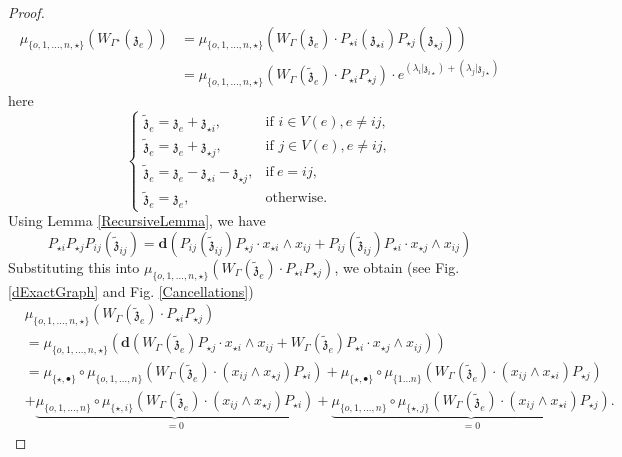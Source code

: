 \documentclass[11pt]{amsart}
\theoremstyle{definition}
\theoremstyle{remark}
\numberwithin{equation}{section}
\begin{document}
\begin{proof}
\begin{align*}
\mu_{\{o,1,\dots ,n,\star\}}\left(W_{\Gamma^{\star}}(\mathfrak{z}_{e})\right)   &=\mu_{\{o,1,\dots, n,\star\}}\left(W_{\Gamma}(\mathfrak{z}_{e})\cdot P_{\star i}(\mathfrak{z}_{\star i})P_{\star j}(\mathfrak{z}_{\star j})\right)     \\
   & =\mu_{\{o,1,\dots, n,\star\}}\left(W_{\Gamma}(\tilde{\mathfrak{z}}_{e})\cdot P_{\star i}P_{\star j}\right)\cdot e^{(\lambda_i|\mathfrak{z}_{i\star})+(\lambda_j|\mathfrak{z}_{j\star})}
\end{align*}
here
$$
\begin{cases}
\tilde{\mathfrak{z}}_e=\mathfrak{z}_e+\mathfrak{z}_{\star i}  , & \mbox{if } i\in V(e),e\neq ij, \\
\tilde{\mathfrak{z}}_e=\mathfrak{z}_e+\mathfrak{z}_{\star j}  , & \mbox{if } j\in V(e),e\neq ij,\\
\tilde{\mathfrak{z}}_e=\mathfrak{z}_e-\mathfrak{z}_{\star i}-\mathfrak{z}_{\star j}   , &  \mbox{if} \ e=ij,\\
\tilde{\mathfrak{z}}_e=\mathfrak{z}_e  , & \mbox{otherwise}.
\end{cases}
$$
Using Lemma \ref{RecursiveLemma}, we have
$$
  P_{\star i}P_{\star j}P_{ij}(\tilde{\mathfrak{z}}_{ij})=\mathbf{d}\left(P_{ij}(\tilde{\mathfrak{z}}_{ij})P_{\star j}\cdot x_{\star i}\wedge x_{ij}+P_{ij}(\tilde{\mathfrak{z}}_{ij})P_{\star i}\cdot x_{\star j}\wedge x_{ij}\right)
$$
Substituting this into $\mu_{\{o,1,\dots, n,\star\}}\left(W_{\Gamma}(\tilde{\mathfrak{z}}_{e})\cdot P_{\star i}P_{\star j}\right)$, we obtain (see Fig. \ref{dExactGraph} and Fig. \ref{Cancellations})
\begin{align*}
& \mu_{\{o,1,\dots, n,\star\}}\left(W_{\Gamma}(\tilde{\mathfrak{z}}_{e})\cdot P_{\star i}P_{\star j}\right)\\
  &= \mu_{\{o,1,\dots, n,\star\}}\left(\mathbf{d}\left(W_{\Gamma}(\tilde{\mathfrak{z}}_{e})P_{\star j}\cdot x_{\star i}\wedge x_{ij}+W_{\Gamma}(\tilde{\mathfrak{z}}_{e})P_{\star i}\cdot x_{\star j}\wedge x_{ij}\right)\right)  \\
   &= \mu_{\{\star,\bullet\}}\circ \mu_{\{o,1,\dots, n\}}\left(W_{\Gamma}(\tilde{\mathfrak{z}}_{e})\cdot (x_{ij}\wedge x_{\star j})P_{\star i }\right)+\mu_{\{\star,\bullet\}}\circ \mu_{\{1\dots n\}}\left(W_{\Gamma}(\tilde{\mathfrak{z}}_{e})\cdot (x_{ij}\wedge x_{\star i})P_{\star j}\right)\\
   &+ \underbrace{ \mu_{\{o,1,\dots ,n\}}\circ\mu_{\{\star, i\}}\left(W_{\Gamma}(\tilde{\mathfrak{z}}_{e})\cdot (x_{ij}\wedge x_{\star j})P_{\star i }\right)}_{=0}+\underbrace{\mu_{\{o,1,\dots ,n\}}\circ\mu_{\{\star, j\}}\left(W_{\Gamma}(\tilde{\mathfrak{z}}_{e})\cdot (x_{ij}\wedge x_{\star i})P_{\star j}\right)}_{=0}.

\end{align*}
\end{proof}
\end{document}
